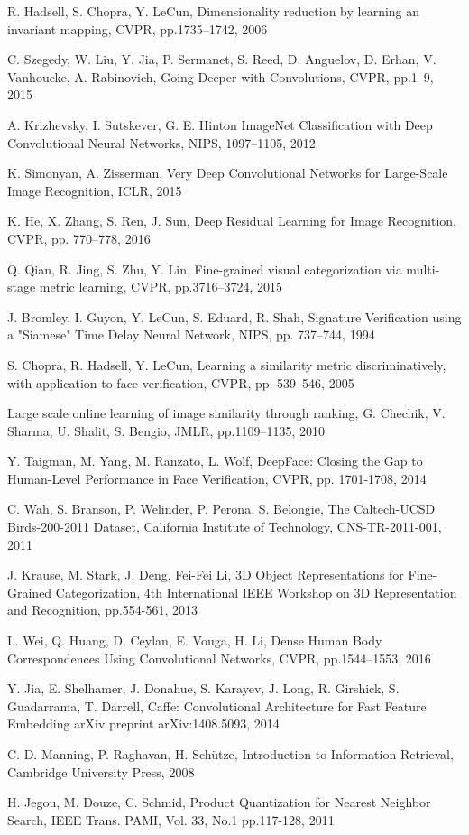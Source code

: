 \documentclass[9pt,technote,compsoc]{./sty/IEEEtran}
\begin{document}
\begin{thebibliography}{1}
R. Hadsell, S. Chopra, Y. LeCun,
Dimensionality reduction by learning an invariant mapping,
CVPR, pp.1735--1742, 2006

C. Szegedy, W. Liu, Y. Jia, P. Sermanet, S. Reed, D. Anguelov, D. Erhan, V. Vanhoucke, A. Rabinovich,
Going Deeper with Convolutions, CVPR, pp.1--9, 2015

A. Krizhevsky, I. Sutskever, G. E. Hinton
ImageNet Classification with Deep Convolutional Neural Networks,
NIPS, 1097--1105, 2012

K. Simonyan, A. Zisserman,
Very Deep Convolutional Networks for Large-Scale Image Recognition,
ICLR, 2015

K. He, X. Zhang, S. Ren, J. Sun,
Deep Residual Learning for Image Recognition,
CVPR, pp. 770--778, 2016

Q. Qian, R. Jing, S. Zhu, Y. Lin,
Fine-grained visual categorization via multi-stage metric learning,
CVPR, pp.3716--3724, 2015

J. Bromley,  I. Guyon, Y. LeCun, S. Eduard, R. Shah,
Signature Verification using a "Siamese" Time Delay Neural Network,
NIPS, pp. 737--744, 1994

S. Chopra, R. Hadsell, Y. LeCun,
Learning a similarity metric discriminatively, with application to face verification,
CVPR, pp. 539--546, 2005

Large scale online learning of image similarity through ranking,
G. Chechik, V. Sharma, U. Shalit, S. Bengio,
JMLR, pp.1109--1135, 2010

Y. Taigman, M. Yang, M. Ranzato, L. Wolf,
DeepFace: Closing the Gap to Human-Level Performance in Face Verification,
CVPR, pp. 1701-1708, 2014

C. Wah, S. Branson, P. Welinder, P. Perona, S. Belongie,
The Caltech-UCSD Birds-200-2011 Dataset,
California Institute of Technology, CNS-TR-2011-001, 2011

J. Krause, M. Stark, J. Deng, Fei-Fei Li,
3D Object Representations for Fine-Grained Categorization,
4th International IEEE Workshop on 3D Representation and Recognition,
pp.554-561, 2013

L. Wei, Q. Huang, D. Ceylan, E. Vouga, H. Li,
Dense Human Body Correspondences Using Convolutional Networks,
CVPR, pp.1544--1553, 2016

Y. Jia, E. Shelhamer, J. Donahue, S. Karayev, J. Long, R. Girshick, S. Guadarrama, T. Darrell,
Caffe: Convolutional Architecture for Fast Feature Embedding
arXiv preprint arXiv:1408.5093, 2014


C. D. Manning, P. Raghavan, H. Sch\"{u}tze,
Introduction to Information Retrieval,	Cambridge University Press, 2008

H. Jegou, M. Douze, C. Schmid,
Product Quantization for Nearest Neighbor Search,
IEEE Trans. PAMI, Vol. 33, No.1 pp.117-128, 2011
\end{thebibliography}
\end{document}

